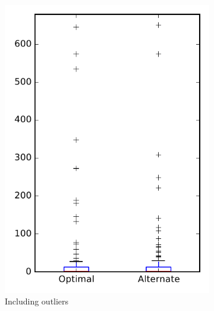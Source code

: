 
\begin{figure}
    \centering
    \begin{subfigure}{.4\textwidth}
        \centering
        \includegraphics[height=0.4\textheight]{figures/combo/flt_rq2_bookkeeper}
        \caption{Including outliers}\label{fig:combo:flt:rq2:bookkeeper_outlier}
    \end{subfigure}%
    \begin{subfigure}{.4\textwidth}
        \centering

\end{subfigure}
\end{figure}
